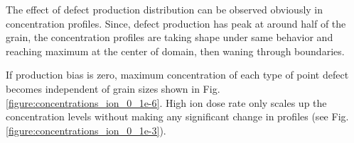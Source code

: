\documentclass[a4paper]{article}
\begin{document}
    The effect of defect production distribution can be observed obviously in concentration profiles. Since, defect production has peak at around half of the grain, the concentration profiles are taking shape under same behavior and reaching maximum at the center of domain, then waning through boundaries.

    If production bias is zero, maximum concentration of each type of point defect becomes independent of grain sizes shown in Fig. \ref{figure:concentrations_ion_0_1e-6}. High ion dose rate only scales up the concentration levels without making any significant change in profiles (see Fig. \ref{figure:concentrations_ion_0_1e-3}).
      \begin{figure}[h!]  %
        \centering
        \qquad

\end{figure}
\end{document}
